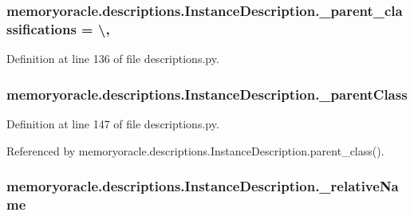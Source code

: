 \subsubsection[{\+\_\+parent\+\_\+classifications}]{\setlength{\rightskip}{0pt plus 5cm}memoryoracle.\+descriptions.\+Instance\+Description.\+\_\+parent\+\_\+classifications = \textbackslash{}\hspace{0.3cm}{\ttfamily [static]}, {\ttfamily [private]}}\label{classmemoryoracle_1_1descriptions_1_1InstanceDescription_afe67235ea54bc1c61f31ce9a9cb95a4b}


Definition at line 136 of file descriptions.\+py.

\hypertarget{classmemoryoracle_1_1descriptions_1_1InstanceDescription_aa481260908e2494221a947d8e97b8e8b}{}
\subsubsection[{\+\_\+parent\+Class}]{\setlength{\rightskip}{0pt plus 5cm}memoryoracle.\+descriptions.\+Instance\+Description.\+\_\+parent\+Class\hspace{0.3cm}{\ttfamily [private]}}\label{classmemoryoracle_1_1descriptions_1_1InstanceDescription_aa481260908e2494221a947d8e97b8e8b}


Definition at line 147 of file descriptions.\+py.



Referenced by memoryoracle.\+descriptions.\+Instance\+Description.\+parent\+\_\+class().

\hypertarget{classmemoryoracle_1_1descriptions_1_1InstanceDescription_ab0ee3b8bb6911dce09c8dc9bedeeb459}{}
\subsubsection[{\+\_\+relative\+Name}]{\setlength{\rightskip}{0pt plus 5cm}memoryoracle.\+descriptions.\+Instance\+Description.\+\_\+relative\+Name\hspace{0.3cm}{\ttfamily [private]}}\label{classmemoryoracle_1_1descriptions_1_1InstanceDescription_ab0ee3b8bb6911dce09c8dc9bedeeb459}


